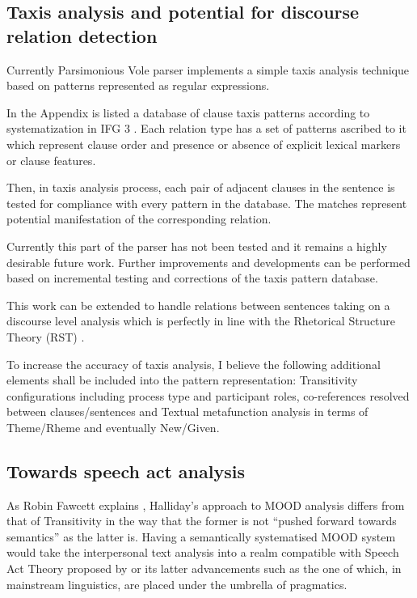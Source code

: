 \subsection{Taxis analysis and potential for discourse relation detection}
Currently Parsimonious Vole parser implements a simple taxis analysis technique based on patterns represented as regular expressions. 


In the Appendix is listed a database of clause taxis patterns according to systematization in IFG 3 \citep{Halliday2004}. Each relation type has a set of patterns ascribed to it which represent clause order and presence or absence of explicit lexical markers or clause features. 

Then, in taxis analysis process, each pair of adjacent clauses in the sentence is tested for compliance with every pattern in the database. The matches represent potential manifestation of the corresponding relation.  

Currently this part of the parser has not been tested and it remains a highly desirable future work. Further improvements and developments can be performed based on incremental testing and corrections of the taxis pattern database.

This work can be extended to handle relations between sentences taking on a discourse level analysis which is perfectly in line with the Rhetorical Structure Theory (RST) \citep{Mann1988,Mann1992}. 

To increase the accuracy of taxis analysis, I believe the following additional elements shall be included into the pattern representation: Transitivity configurations including process type and participant roles, co-references resolved between clauses/sentences and Textual metafunction analysis in terms of Theme/Rheme and eventually New/Given.

\subsection{Towards speech act analysis}
As Robin Fawcett explains \citep{Fawcett2011}, Halliday's approach to MOOD analysis differs from that of Transitivity in the way that the former is not ``pushed forward towards semantics'' as the latter is. Having a semantically systematised MOOD system would take the interpersonal text analysis into a realm compatible with Speech Act Theory proposed by \citet{Austin1975} or its latter advancements such as the one of \citet{Searle1969} which, in mainstream linguistics, are placed under the umbrella of pragmatics. 

